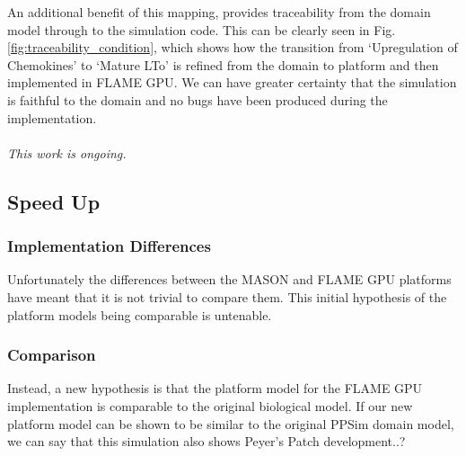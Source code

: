 \documentclass{UoYCSproject}
\begin{document}
An additional benefit of this mapping, provides traceability from the domain model through to the simulation code.
This can be clearly seen in Fig. \ref{fig:traceability_condition}, which shows how the transition from `Upregulation of Chemokines' to `Mature \gls{LTo}' is refined from the \gls{domain} to \gls{platform} and then implemented in \gls{FLAME GPU}.
We can have greater certainty that the simulation is faithful to the domain and no bugs have been produced during the implementation.
\\\\
\textit{This work is ongoing.}

\subsection{Speed Up}
\subsubsection{Implementation Differences}
Unfortunately the differences between the \gls{MASON} and \gls{FLAME GPU} platforms have meant that it is not trivial to compare them.
This initial hypothesis of the platform models being comparable is untenable.




\subsubsection{Comparison}
Instead, a new hypothesis is that the platform model for the \gls{FLAME GPU} implementation is comparable to the original biological model.
If our new platform model can be shown to be similar to the original PPSim domain model, we can say that this simulation also shows Peyer's Patch development..?
\end{document}
